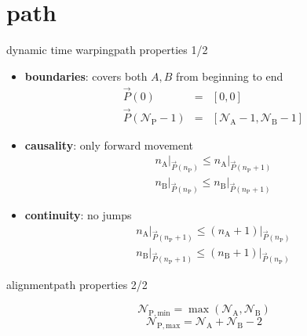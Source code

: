     \section[path]{path}
        \begin{frame}{dynamic time warping}{path properties 1/2}
            \begin{itemize}
                    \item	\textbf{boundaries}: covers both $A,B$ from beginning to end
                            \begin{eqnarray*}
                                \vec{P}(0) 		&=& [0, 0] \\
                                \vec{P}(\mathcal{N}_{\mathrm{P}}-1) 	&=& [\mathcal{N}_\mathrm{A}-1, \mathcal{N}_\mathrm{B}-1] 
                            \end{eqnarray*}
                    
                    \item<2->	\textbf{causality}: only forward movement
                            \begin{eqnarray*}
                                n_\mathrm{A}\big|_{\vec{P}(n_\mathrm{P})} \leq n_\mathrm{A}\big|_{\vec{P}(n_\mathrm{P}+1)} \\ 
                                n_\mathrm{B}\big|_{\vec{P}(n_\mathrm{P})} \leq n_\mathrm{B}\big|_{\vec{P}(n_\mathrm{P}+1)} 
                            \end{eqnarray*}
                    
                    \item<3->	\textbf{continuity}: no jumps
                            \begin{eqnarray*}
                                n_\mathrm{A}\big|_{\vec{P}(n_\mathrm{P}+1)} \leq (n_\mathrm{A}+1)\big|_{\vec{P}(n_\mathrm{P})} \\ 
                                n_\mathrm{B}\big|_{\vec{P}(n_\mathrm{P}+1)} \leq (n_\mathrm{B}+1)\big|_{\vec{P}(n_\mathrm{P})} 
                            \end{eqnarray*}
            \end{itemize}
        \end{frame}
        \begin{frame}{alignment}{path properties 2/2}
                \begin{figure}
                    
                \end{figure}

                    \begin{equation*}
                        \mathcal{N}_\mathrm{P, min} = \max(\mathcal{N}_\mathrm{A}, \mathcal{N}_\mathrm{B})
                    \end{equation*}
                    \begin{equation*}
                        \mathcal{N}_\mathrm{P, max} = \mathcal{N}_\mathrm{A} + \mathcal{N}_\mathrm{B} - 2
                    \end{equation*}
        \end{frame}
        
